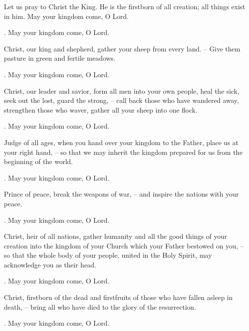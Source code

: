 \lettrine[lines=2]{L}{}et us pray to Christ the King. He is the firstborn of all creation; all things exist in him. May your kingdom come, O Lord.
\par \Rbar. May your kingdom come, O Lord.

Christ, our king and shepherd, gather your sheep from every land.
– Give them pasture in green and fertile meadows.
\par \Rbar. May your kingdom come, O Lord.

Christ, our leader and savior, form all men into your own people, heal the sick, seek out the lost, guard the strong,
– call back those who have wandered away, strengthen those who waver, gather all your sheep into one flock.
\par \Rbar. May your kingdom come, O Lord.

Judge of all ages, when you hand over your kingdom to the Father, place us at your right hand,
– so that we may inherit the kingdom prepared for us from the beginning of the world.
\par \Rbar. May your kingdom come, O Lord.

Prince of peace, break the weapons of war,
– and inspire the nations with your peace.
\par \Rbar. May your kingdom come, O Lord.

Christ, heir of all nations, gather humanity and all the good things of your creation into the kingdom of your Church which your Father bestowed on you,
– so that the whole body of your people, united in the Holy Spirit, may acknowledge you as their head.
\par \Rbar. May your kingdom come, O Lord.

Christ, firstborn of the dead and firstfruits of those who have fallen asleep in death,
– bring all who have died to the glory of the resurrection.
\par \Rbar. May your kingdom come, O Lord.